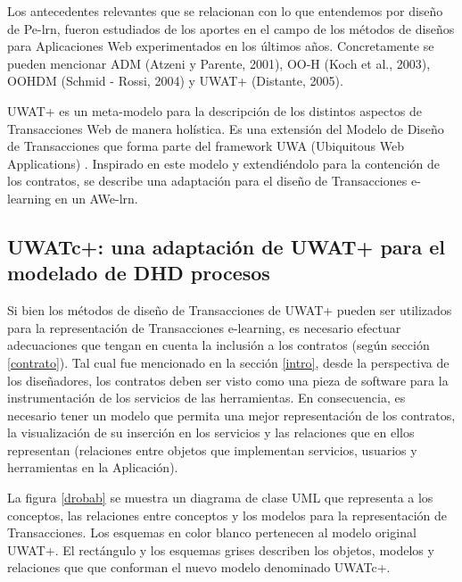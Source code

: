 Los antecedentes relevantes que se relacionan con lo que entendemos por diseño
de Pe-lrn, fueron estudiados de los aportes en el campo de los métodos de
diseños para Aplicaciones Web experimentados en los últimos años. Concretamente
se pueden mencionar ADM (Atzeni y Parente, 2001), OO-H (Koch et al., 2003),
OOHDM (Schmid - Rossi, 2004) y UWAT+ (Distante, 2005).

UWAT+ es un meta-modelo para la descripción de los distintos aspectos de
Transacciones Web de manera holística. Es una extensión del Modelo de Diseño de
Transacciones que forma  parte del framework UWA (Ubiquitous Web Applications)
\cite{UWA}. Inspirado en este modelo y extendiéndolo para la contención de los
contratos, se describe una adaptación para el diseño de Transacciones e-learning
en un AWe-lrn.

\subsection {UWATc+: una adaptación de UWAT+ para el modelado de DHD procesos } \label{uwatc7}

Si bien los métodos de diseño de Transacciones de UWAT+ pueden ser utilizados
para la representación de Transacciones e-learning, es necesario efectuar
adecuaciones que tengan en cuenta la inclusión a los contratos (según sección
\ref{contrato}). Tal cual fue mencionado en la sección \ref{intro}, desde la
perspectiva de los diseñadores, los contratos deben ser visto como una pieza de
software para la instrumentación de los servicios de las herramientas. En
consecuencia, es necesario tener un modelo que permita una mejor representación
de los contratos, la visualización de su inserción en los servicios y las
relaciones que en ellos representan (relaciones entre objetos que implementan
servicios, usuarios y herramientas en la Aplicación). 


La figura \ref{drobab} se muestra un diagrama de clase UML que representa a los
conceptos, las relaciones entre conceptos y los modelos para la representación
de Transacciones. Los esquemas en color blanco pertenecen al modelo original
UWAT+. El rectángulo y los esquemas grises describen los objetos, modelos y
relaciones que  que conforman el nuevo modelo denominado UWATc+.

